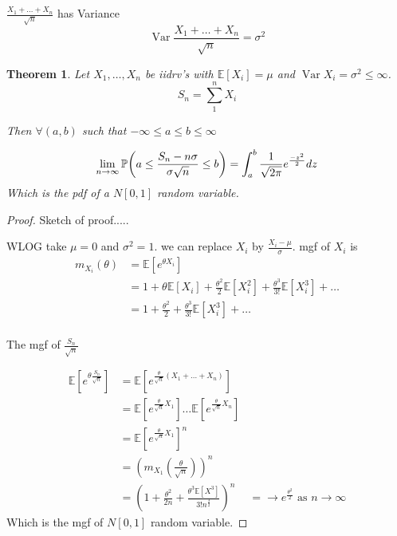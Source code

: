 \documentclass{notes}
\theoremstyle{plain}
\newtheorem{theorem}{Theorem}[chapter]
\newcommand{\bP}{\mathbb{P}}
\newcommand{\bE}{\mathbb{E}}
\newcommand{\prob}[1]{\bP \negthinspace\left(#1\right)}
\newcommand{\expect}[1]{\bE\!\left[#1\right]}
\DeclareMathOperator{\var}{Var}
\begin{document}
\vspace{2in}

$\frac{X_1+\dots+X_n}{\sqrt{n}}$  has Variance
\[
\var{\frac{X_1+\dots+X_n}{\sqrt{n}}} = \sigma^2
\]

\vspace{2in}

\begin{theorem}
Let $X_1,\dots,X_n$ be iidrv's with $\expect{X_i} = \mu$ and
$\var{X_i} = \sigma^2 \le \infty$.
\[
S_n = \sum_1^n X_i 
\]

Then $\forall (a,b)$ such that $ -\infty \leq a \leq b \leq \infty$

\[
\lim_{n\to\infty} \prob{ a \leq \frac{S_n - n\sigma}{\sigma\sqrt{n}}
  \leq b} = \int_a^b \frac{1}{\sqrt{2\pi}}e^{\frac{-z^2}{2}}dz
\]
Which is the pdf of a $N[0,1]$ random variable.

\vspace{2in}

\end{theorem}

\begin{proof}
Sketch of proof.....

WLOG take $\mu = 0$ and $\sigma^2 = 1 $. we can replace $X_i$ by
$\frac{X_i - \mu}{\sigma}$. mgf of $X_i$ is
\begin{align*}
m_{X_i}(\theta) &= \expect{e^{\theta X_i}}\\
&= 1 + \theta\expect{X_i} + \frac{\theta^2}{2} \expect{X_i^2} + 
\frac{\theta^3}{3!} \expect{X_i^3} + \dots\\
&= 1 + \frac{\theta^2}{2} + \frac{\theta^3}{3!} \expect{X_i^3} + \dots\\
\end{align*}

The mgf of $\frac{S_n}{\sqrt{n}}$

\begin{align*}
\expect{e^{\theta\frac{S_n}{\sqrt{n}}}} & =
    \expect{e^{\frac{\theta}{\sqrt{n}}(X_1+\dots +X_n)}}\\
&=  \expect{e^{\frac{\theta}{\sqrt{n}}X_1}}\dots
    \expect{e^{\frac{\theta}{\sqrt{n}}X_n}}\\
&= \expect{e^{\frac{\theta}{\sqrt{n}}X_1}}^n\\
&= \left(m_{X_1}\left(\frac{\theta}{\sqrt{n}} \right) \right)^n\\
&=\left(1 + \frac{\theta^2}{2n} + \frac{\theta^3
    \expect{X^3}}{3!n^{\frac{3}{2}}} \right)^n
&= \to e^{\frac{\theta^2}{2}} \text{ as } n \to \infty
\end{align*}
Which is the mgf of $N[0,1]$ random variable.
\end{proof}
\end{document}
